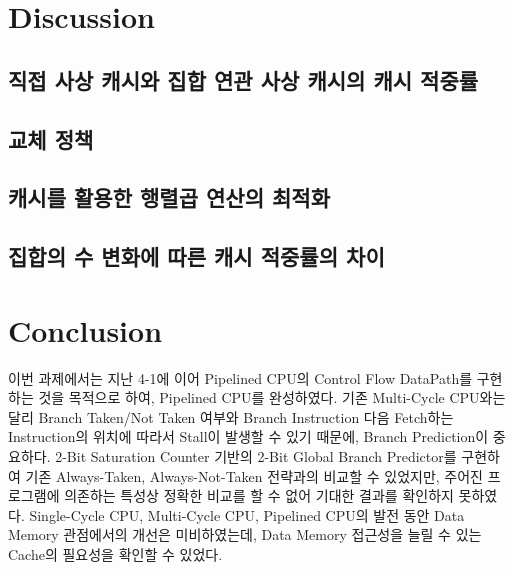 \documentclass[openright, a4paper]{article}
\begin{document}

\section{Discussion}

\subsection{직접 사상 캐시와 집합 연관 사상 캐시의 캐시 적중률}

\subsection{교체 정책}

\subsection{캐시를 활용한 행렬곱 연산의 최적화}

\subsection{집합의 수 변화에 따른 캐시 적중률의 차이}


\section{Conclusion}

이번 과제에서는 지난 4-1에 이어 Pipelined CPU의 Control Flow DataPath를 구현하는 것을 목적으로 하여, Pipelined CPU를 완성하였다.
기존 Multi-Cycle CPU와는 달리 Branch Taken/Not Taken 여부와 Branch Instruction 다음 Fetch하는 Instruction의 위치에 따라서 Stall이 발생할 수 있기 때문에, Branch Prediction이 중요하다.
2-Bit Saturation Counter 기반의 2-Bit Global Branch Predictor를 구현하여 기존 Always-Taken, Always-Not-Taken 전략과의 비교할 수 있었지만, 주어진 프로그램에 의존하는 특성상 정확한 비교를 할 수 없어 기대한 결과를 확인하지 못하였다.
Single-Cycle CPU, Multi-Cycle CPU, Pipelined CPU의 발전 동안 Data Memory 관점에서의 개선은 미비하였는데, Data Memory 접근성을 늘릴 수 있는 Cache의 필요성을 확인할 수 있었다.
\end{document}
